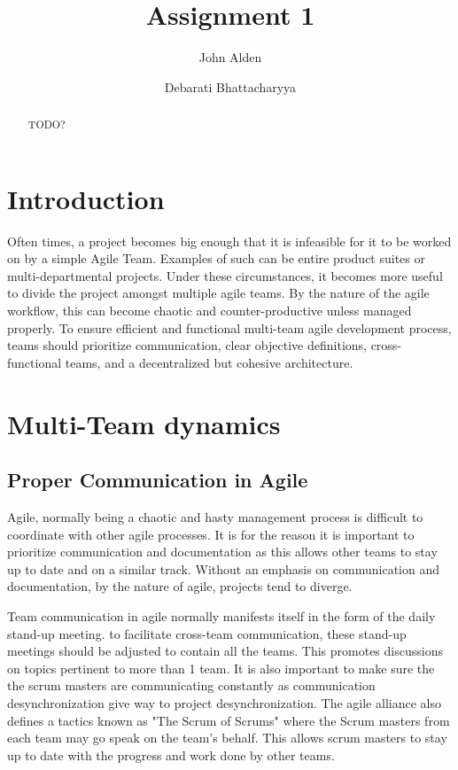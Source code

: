 \documentclass[sigplan,screen]{acmart}
\begin{document}
\title{Assignment 1}

%
%
\author{John Alden}

\author{Debarati Bhattacharyya}

%
%
\begin{abstract}
TODO?
\end{abstract}

%
%
\maketitle

%
%
\section{Introduction}
Often times, a project becomes big enough that it is infeasible for it to be worked on by a simple Agile Team. Examples of such can be entire product suites or multi-departmental projects. Under these circumstances, it becomes more useful to divide the project amongst multiple agile teams. By the nature of the agile workflow, this can become chaotic and counter-productive unless managed properly. To ensure efficient and functional multi-team agile development process, teams should prioritize communication, clear objective definitions, cross-functional teams, and a decentralized but cohesive architecture.

\section{Multi-Team dynamics}
\subsection{Proper Communication in Agile}
Agile, normally being a chaotic and hasty management process is difficult to coordinate with other agile processes. It is for the reason it is important to prioritize communication and documentation as this allows other teams to stay up to date and on a similar track. Without an emphasis on communication and documentation, by the nature of agile, projects tend to diverge.

Team communication in agile normally manifests itself in the form of the daily stand-up meeting. to facilitate cross-team communication, these stand-up meetings should be adjusted to contain all the teams. This promotes discussions on topics pertinent to more than 1 team. It is also important to make sure the the scrum masters are communicating constantly as communication desynchronization give way to project desynchronization. The agile alliance also defines a tactics known as "The Scrum of Scrums" where the Scrum masters from each team may go speak on the team's behalf. This allows scrum masters to stay up to date with the progress and work done by other teams.
\end{document}
